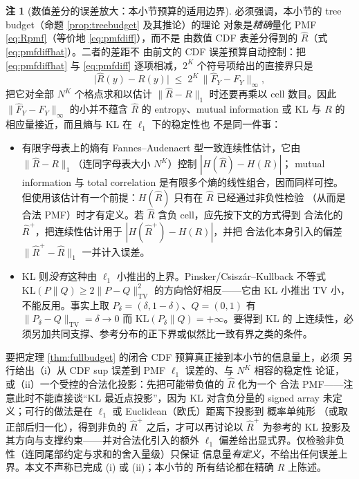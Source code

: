 \documentclass[a4paper,11pt]{article}
\theoremstyle{definition}
\newtheorem{remark}{注}
\newcommand{\1}{\mathbf 1}
\newcommand{\TV}{\mathrm{TV}}
\newcommand{\KL}{\mathrm{KL}}
\begin{document}
\begin{remark}[数值差分的误差放大：本小节预算的适用边界]
\label{rem:pmfstab}
必须强调，本小节的 tree budget（命题 \ref{prop:treebudget} 及其推论）的理论
对象是\emph{精确}量化 PMF \eqref{eq:Rpmf}（等价地 \eqref{eq:pmfdiff}），而不是
由数值 CDF 表差分得到的 $\widehat R$（式 \eqref{eq:pmfdiffhat}）。二者的差距不
由前文的 CDF 误差预算自动控制：把 \eqref{eq:pmfdiffhat} 与 \eqref{eq:pmfdiff}
逐项相减，$2^{K}$ 个符号项给出的直接界只是
\[
\bigl|\widehat R(y)-R(y)\bigr|
\;\le\;2^{K}\,\bigl\|\widehat F_Y-F_Y\bigr\|_\infty ,
\]
把它对全部 $N^{K}$ 个格点求和以估计
$\|\widehat R-R\|_{1}$ 时还要再乘以 cell 数目。因此
$\|\widehat F_Y-F_Y\|_\infty$ 的小并不蕴含 $\widehat R$ 的 entropy、mutual
information 或 KL 与 $R$ 的相应量接近，而且熵与 KL 在 $\ell_1$ 下的稳定性也
不是同一件事：
\begin{itemize}
\item 有限字母表上的熵有 Fannes--Audenaert 型一致连续性估计，它由
$\|\widehat R-R\|_1$（连同字母表大小 $N^{K}$）控制 $|H(\widehat R)-H(R)|$；
mutual information 与 total correlation 是有限多个熵的线性组合，因而同样可控。
但使用该估计有一个前提：$H(\widehat R)$ 只有在 $\widehat R$ 已经通过非负性检验
（从而是合法 PMF）时才有定义。若 $\widehat R$ 含负 cell，应先按下文的方式得到
合法化的 $\widehat R^{+}$，把连续性估计用于 $|H(\widehat R^{+})-H(R)|$，并把
合法化本身引入的偏差 $\|\widehat R^{+}-\widehat R\|_1$ 一并计入误差。
\item KL 则\emph{没有}这种由 $\ell_1$ 小推出的上界。Pinsker/Csisz\'ar--Kullback
不等式 $\KL(P\|Q)\ge2\|P-Q\|_{\TV}^{2}$ 的方向恰好相反——它由 KL 小推出 TV 小，
不能反用。事实上取 $P_\delta=(\delta,1-\delta)$、$Q=(0,1)$ 有
$\|P_\delta-Q\|_{\TV}=\delta\to0$ 而 $\KL(P_\delta\|Q)=+\infty$。要得到 KL 的
上连续性，必须另加共同支撑、参考分布的正下界或似然比一致有界之类的条件。
\end{itemize}
要把定理 \ref{thm:fullbudget} 的闭合 CDF 预算真正接到本小节的信息量上，必须
另行给出（i）从 CDF sup 误差到 PMF $\ell_1$ 误差的、与 $N^{K}$ 相容的稳定性
论证，或（ii）一个受控的合法化投影：先把可能带负值的 $\widehat R$ 化为一个
合法 PMF——注意此时不能直接谈“KL 最近点投影”，因为 $\KL$ 对含负分量的
signed array 未定义；可行的做法是在 $\ell_1$ 或 Euclidean（欧氏）距离下投影到
概率单纯形
（或取正部后归一化），得到非负的 $\widehat R^{+}$ 之后，才可以再讨论以
$\widehat R^{+}$ 为参考的 KL 投影及其方向与支撑约束——并对合法化引入的额外
$\ell_1$ 偏差给出显式界。仅检验非负性（连同尾部约定与求和的舍入量级）只保证
信息量\emph{有定义}，不给出任何误差上界。本文不声称已完成 (i) 或 (ii)；本小节的
所有结论都在精确 $R$ 上陈述。
\end{remark}
\end{document}
